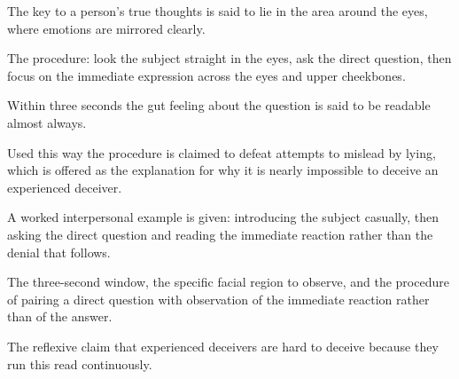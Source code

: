 

\begin{distilled}
  \item The key to a person's true thoughts is said to lie in the area around the eyes, where emotions are mirrored clearly.
  \item The procedure: look the subject straight in the eyes, ask the direct question, then focus on the immediate expression across the eyes and upper cheekbones.
  \item Within three seconds the gut feeling about the question is said to be readable almost always.
  \item Used this way the procedure is claimed to defeat attempts to mislead by lying, which is offered as the explanation for why it is nearly impossible to deceive an experienced deceiver.
  \item A worked interpersonal example is given: introducing the subject casually, then asking the direct question and reading the immediate reaction rather than the denial that follows.
\end{distilled}

\begin{unique}
  \item The three-second window, the specific facial region to observe, and the procedure of pairing a direct question with observation of the immediate reaction rather than of the answer.
  \item The reflexive claim that experienced deceivers are hard to deceive because they run this read continuously.
\end{unique}
